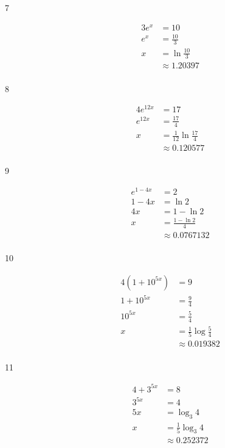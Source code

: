 \documentclass{exam}
\begin{document}
    \begin{description}

      \item[7]
        \begin{align*}
          3 e^x &= 10 \\
          e^x   &= \frac{10}{3} \\
          x     &= \ln \frac{10}{3} \\
                &\approx 1.20397 \\
        \end{align*}

      \item[8]
        \begin{align*}
          4 e^{12x} &= 17 \\
          e^{12x}   &= \frac{17}{4} \\
          x         &= \frac{1}{12} \ln \frac{17}{4} \\
                    &\approx 0.120577 \\
        \end{align*}

      \item[9]
        \begin{align*}
          e^{1 - 4x} &= 2 \\
          1 - 4x     &= \ln 2 \\
          4x         &= 1 - \ln 2 \\
          x          &= \frac{1 - \ln 2}{4} \\
                     &\approx 0.0767132 \\
        \end{align*}

      \item[10]
        \begin{align*}
          4 (1 + 10^{5x}) &= 9 \\
          1 + 10^{5x}     &= \frac{9}{4} \\
          10^{5x}         &= \frac{5}{4}\\
          x               &= \frac{1}{5} \log \frac{5}{4} \\
                          &\approx 0.019382 \\
        \end{align*}

      \item[11]
        \begin{align*}
          4 + 3^{5x} &= 8 \\
          3^{5x}     &= 4 \\
          5x         &= \log_3 4 \\
          x          &= \frac{1}{5} \log_3 4 \\
                     &\approx 0.252372 \\
        \end{align*}


\end{description}
\end{document}
